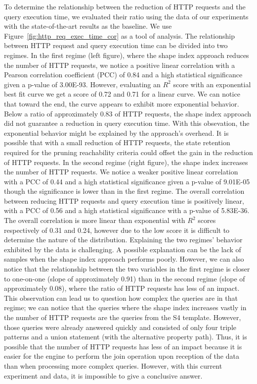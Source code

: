 To determine the relationship between the reduction of HTTP requests and the query execution time, we evaluated their ratio using 
the data of our experiments with the state-of-the-art results as the baseline.
We use Figure~\ref{fig:http_req_exec_time_cor} as a tool of analysis.
The relationship between HTTP request and query execution time can be divided into two regimes.
In the first regime (left figure), where the shape index approach reduces the number of HTTP requests, we notice a positive linear correlation with a
Pearson correlation coefficient (PCC) of 0.84 and a high statistical significance given a p-value of 3.00E-93.
However, evaluating an $R^2$ score with an exponential best fit curve we get a score of 0.72 and 0.71 for a linear curve.
We can notice that toward the end, the curve appears to exhibit more exponential behavior.
Below a ratio of approximately 0.83 of HTTP requests, the shape index approach did not guarantee a reduction in query execution time.
With this obsevation, the exponential behavior might be explained by the approach's overhead. 
It is possible that with a small reduction of HTTP requests, the state retention required for the pruning reachability criteria could offset the gain in the reduction of HTTP requests.
In the second regime (right figure), the shape index increases the number of HTTP requests.
We notice a weaker positive linear correlation with a PCC of 0.44 and a high statistical significance given a p-value of 9.01E-05 though the significance is lower than in the first regime.
The overall correlation between reducing HTTP requests and query execution time is positively linear, with a PCC of 0.56 and a high statistical significance with a p-value of 5.83E-36.
The overall correlation is more linear than exponential with $R^2$ scores respectively of 0.31 and 0.24, however due to the low score it is difficult to determine the nature of the distribution.
Explaining the two regimes' behavior exhibited by the data is challenging.
A possible explanation can be the lack of samples when the shape index approach performs poorly.
However, we can also notice that the relationship between the two variables in the first regime is closer to one-on-one (slope of approximately 0.91) than in the second regime (slope of approximately 0.08), where the ratio of HTTP requests has less of an impact.
This observation can lead us to question how complex the queries are in that regime; we can notice that the queries where the shape index increases vastly in the number 
of HTTP requests are the queries from the S4 template. 
However, those queries were already answered quickly and consisted of only four triple patterns and a union statement (with the alternative property path). 
Thus, it is possible that the number of HTTP requests has less of an impact because it is easier for the engine to perform the join operation upon reception of the data than when processing more complex queries.
However, with this current experiment and data, it is impossible to give a conclusive answer.


